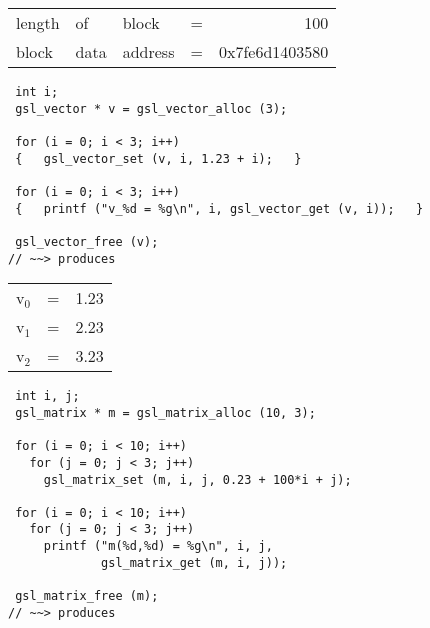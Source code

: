 \documentclass[10pt,oneside,x11names]{article}
\begin{document}
\begin{center}
\begin{tabular}{llllr}
length & of & block & = & 100\\
block & data & address & = & 0x7fe6d1403580\\
\end{tabular}
\end{center}

\begin{verbatim}
 int i;
 gsl_vector * v = gsl_vector_alloc (3);

 for (i = 0; i < 3; i++) 
 {   gsl_vector_set (v, i, 1.23 + i);   }

 for (i = 0; i < 3; i++)
 {   printf ("v_%d = %g\n", i, gsl_vector_get (v, i));   }

 gsl_vector_free (v);
// ~~> produces
\end{verbatim}

\begin{center}
\begin{tabular}{llr}
v\(_{\text{0}}\) & = & 1.23\\
v\(_{\text{1}}\) & = & 2.23\\
v\(_{\text{2}}\) & = & 3.23\\
\end{tabular}
\end{center}

\begin{verbatim}
 int i, j;
 gsl_matrix * m = gsl_matrix_alloc (10, 3);

 for (i = 0; i < 10; i++)
   for (j = 0; j < 3; j++)
     gsl_matrix_set (m, i, j, 0.23 + 100*i + j);

 for (i = 0; i < 10; i++)
   for (j = 0; j < 3; j++)
     printf ("m(%d,%d) = %g\n", i, j,
             gsl_matrix_get (m, i, j));

 gsl_matrix_free (m);
// ~~> produces
\end{verbatim}
\end{document}
